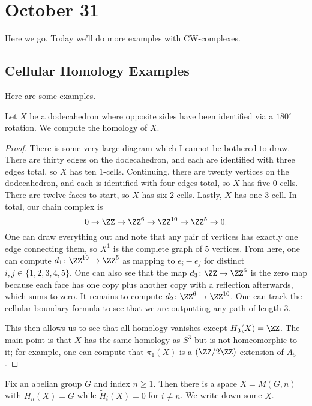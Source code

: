 \documentclass[../notes.tex]{subfiles}
\begin{document}
\section{October 31}

Here we go. Today we'll do more examples with CW-complexes.

\subsection{Cellular Homology Examples}
Here are some examples.
\begin{example}
	Let $X$ be a dodecahedron where opposite sides have been identified via a $180^\circ$ rotation. We compute the homology of $X$.
\end{example}
\begin{proof}
	There is some very large diagram which I cannot be bothered to draw. There are thirty edges on the dodecahedron, and each are identified with three edges total, so $X$ has ten $1$-cells. Continuing, there are twenty vertices on the dodecahedron, and each is identified with four edges total, so $X$ has five $0$-cells. There are twelve faces to start, so $X$ has six $2$-cells. Lastly, $X$ has one $3$-cell. In total, our chain complex is
	\[0\to\ZZ\to\ZZ^6\to\ZZ^{10}\to\ZZ^5\to0.\]
	One can draw everything out and note that any pair of vertices has exactly one edge connecting them, so $X^1$ is the complete graph of $5$ vertices. From here, one can compute $d_1\colon\ZZ^{10}\to\ZZ^5$ as mapping to $e_i-e_j$ for distinct $i,j\in\{1,2,3,4,5\}$. One can also see that the map $d_3\colon\ZZ\to\ZZ^6$ is the zero map because each face has one copy plus another copy with a reflection afterwards, which sums to zero. It remains to compute $d_2\colon\ZZ^6\to\ZZ^{10}$. One can track the cellular boundary formula to see that we are outputting any path of length $3$.

	This then allows us to see that all homology vanishes except $H_3(X)=\ZZ$. The main point is that $X$ has the same homology as $S^3$ but is not homeomorphic to it; for example, one can compute that $\pi_1(X)$ is a $(\ZZ/2\ZZ)$-extension of $A_5$.
\end{proof}
\begin{example}
	Fix an abelian group $G$ and index $n\ge1$. Then there is a space $X=M(G,n)$ with $H_n(X)=G$ while $\widetilde H_i(X)=0$ for $i\ne n$. We write down some $X$.
\end{example}
\end{document}
